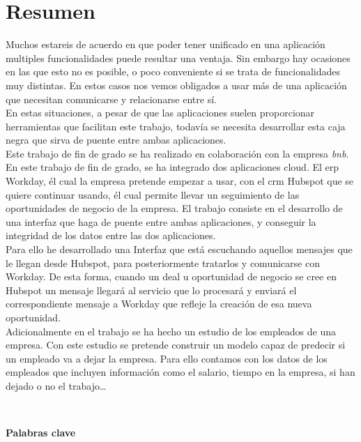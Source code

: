 \chapter*{Resumen}
	
	Muchos estareis de acuerdo en que poder tener unificado en una aplicación multiples funcionalidades puede resultar una ventaja.
	Sin embargo hay ocasiones en las que esto no es posible, o poco conveniente si se trata de funcionalidades muy distintas.
	En estos casos nos vemos obligados a usar más de una aplicación que necesitan comunicarse y relacionarse entre sí.\\
	
	En estas situaciones, a pesar de que las aplicaciones suelen proporcionar herramientas que facilitan este trabajo, todavía se necesita desarrollar esta
	caja negra que sirva de puente entre ambas aplicaciones.\\
	
	Este trabajo de fin de grado se ha realizado en colaboración con la empresa \textit{\acrfull{bnb}}.
	En este trabajo de fin de grado, se ha integrado dos aplicaciones cloud. El \acrshort{erp} Workday, él cual la empresa pretende empezar a usar,
	con el \acrshort{crm} Hubspot que se quiere continuar usando, él cual permite llevar un seguimiento de las oportunidades de negocio de la empresa.
	El trabajo consiste en el desarrollo de una interfaz que haga de puente entre ambas aplicaciones, 
	y conseguir la integridad de los datos entre las dos aplicaciones. \\
	
	
	Para ello he desarrollado una Interfaz que está escuchando aquellos mensajes que le llegan desde Hubspot, para posteriormente tratarlos y comunicarse con Workday.
	De esta forma, cuando un deal u oportunidad de negocio se cree en Hubspot un mensaje llegará al servicio que lo procesará y enviará el correspondiente
	mensaje a Workday que refleje la creación de esa nueva oportunidad.\\
	
	
	Adicionalmente en el trabajo se ha hecho un estudio de los empleados de una empresa.
	Con este estudio se pretende construir un modelo capaz de predecir si un empleado va a dejar la empresa. 
	Para ello contamos con los datos de los empleados que incluyen información como el salario, tiempo en la empresa,
	si han dejado o no el trabajo\ldots

	\
	
	\textbf{Palabras clave}
    
